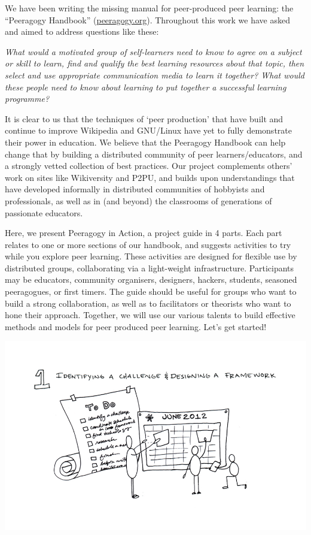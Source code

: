 We have been writing the missing manual for peer-produced peer learning:
the ``Peeragogy Handbook''
(\href{http://peeragogy.org/}{peeragogy.org}). Throughout this work we
have asked and aimed to address questions like these:

\emph{What would a motivated group of self-learners need to know to
agree on a subject or skill to learn, find and qualify the best learning
resources about that topic, then select and use appropriate
communication media to learn it together? What would these people need
to know about learning to put together a successful learning programme?}

It is clear to us that the techniques of `peer production' that have
built and continue to improve Wikipedia and GNU/Linux have yet to fully
demonstrate their power in education. We believe that the Peeragogy
Handbook can help change that by building a distributed community of
peer learners/educators, and a strongly vetted collection of best
practices. Our project complements others' work on sites like
Wikiversity and P2PU, and builds upon understandings that have developed
informally in distributed communities of hobbyists and professionals, as
well as in (and beyond) the classrooms of generations of passionate
educators.

Here, we present Peeragogy in Action, a project guide in 4 parts. Each
part relates to one or more sections of our handbook, and suggests
activities to try while you explore peer learning. These activities are
designed for flexible use by distributed groups, collaborating via a
light-weight infrastructure. Participants may be educators, community
organisers, designers, hackers, students, seasoned peeragogues, or first
timers. The guide should be useful for groups who want to build a strong
collaboration, as well as to facilitators or theorists who want to hone
their approach. Together, we will use our various talents to build
effective methods and models for peer produced peer learning. Let's get
started!

\begin{center}
\includegraphics{../pictures/OpenBook-2-1.jpg}
\end{center}

